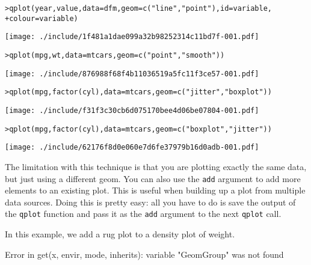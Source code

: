 \begin{alltt}
> qplot(year, value, data = dfm, geom = c("line", "point"), id = variable, 
+     colour = variable)
\end{alltt}
\texttt{[image: ./include/1f481a1dae099a32b98252314c11bd7f-001.pdf]}
\begin{alltt}

> qplot(mpg, wt, data = mtcars, geom = c("point", "smooth"))
\end{alltt}
\texttt{[image: ./include/876988f68f4b11036519a5fc11f3ce57-001.pdf]}
\begin{alltt}

> qplot(mpg, factor(cyl), data = mtcars, geom = c("jitter", "boxplot"))
\end{alltt}
\texttt{[image: ./include/f31f3c30cb6d075170bee4d06be07804-001.pdf]}
\begin{alltt}

> qplot(mpg, factor(cyl), data = mtcars, geom = c("boxplot", "jitter"))
\end{alltt}
\texttt{[image: ./include/62176f8d0e060e7d6fe37979b16d0adb-001.pdf]}
\begin{alltt}

\end{alltt}

The limitation with this technique is that you are plotting exactly the same data, but just using a different geom.  You can also use the {\tt add} argument to add more elements to an existing plot.  This is useful when building up a plot from multiple data sources. Doing this is pretty easy: all you have to do is save the output of the {\tt qplot} function and pass it as the {\tt add} argument to the next {\tt qplot} call.

In this example, we add a rug plot to a density plot of weight.

Error in get(x, envir, mode, inherits): variable "GeomGroup" was not found \\ 


